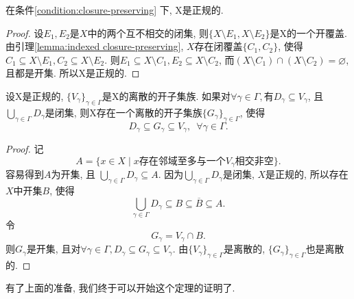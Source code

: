 \begin{lemma} \label{lemma:regular}
  在条件\ref{condition:closure-preserving} 下, X是正规的.
\end{lemma}
\begin{proof}
  设$E_1, E_2$是$X$中的两个互不相交的闭集,
  则$\{ X \setminus E_1, X \setminus E_2 \}$是X的一个开覆盖.
  由引理\ref{lemma:indexed closure-preserving},
  $X$存在闭覆盖$\{ C_1, C_2 \}$,
  使得$C_1 \subseteq X \setminus E_1, C_2 \subseteq X \setminus E_2$.
  则$E_1 \subseteq X \setminus C_1, E_2 \subseteq X \setminus C_2$,
  而$(X \setminus C_1) \cap (X \setminus C_2) = \varnothing$,
  且都是开集. 所以X是正规的.
\end{proof}

\begin{lemma} \label{lemma:Dowker}
   设X是正规的, $\{ V_\gamma \}_{\gamma \in \Gamma}$是X的离散的开子集族.
  如果对$\forall \gamma \in \Gamma, \text{有}D_{\gamma} \subseteq V_{\gamma}$,
  且$\bigcup_{\gamma \in \Gamma} D_{\gamma}$是闭集,
  则X存在一个离散的开子集族$\{ G_{\gamma} \}_{\gamma \in \Gamma}$, 使得
  \[
    D_{\gamma} \subseteq G_{\gamma} \subseteq V_{\gamma}, \,\,\, \forall \gamma \in \Gamma.
  \]
\end{lemma}
\begin{proof}
  记
  \[
    A = \{ x \in X \mid x \text{存在邻域至多与一个} V_{\gamma} \text{相交非空} \}.
  \]
  容易得到$A$为开集, 且
  $\bigcup_{\gamma \in \Gamma} D_\gamma \subseteq A$.
  因为$\bigcup_{\gamma \in \Gamma} D_\gamma$是闭集, $X$是正规的,
  所以存在$X$中开集$B$, 使得
  \[
    \bigcup_{\gamma \in \Gamma} D_\gamma \subseteq B \subseteq \overline{B} \subseteq A.
  \]
  令
  \[
    G_\gamma = V_\gamma \cap B.
  \]
  则$G_\gamma$是开集, 且对$\forall \gamma \in \Gamma,
  D_\gamma \subseteq G_\gamma \subseteq V_\gamma$.
  由$\{ V_\gamma \}_{\gamma \in \Gamma}$是离散的, $\{ G_\gamma \}_{\gamma \in \Gamma}$也是离散的.
\end{proof}

有了上面的准备, 我们终于可以开始这个定理的证明了.

